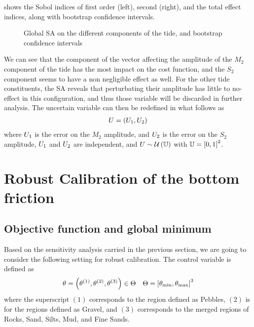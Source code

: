 \documentclass[../../Main_ManuscritThese.tex]{subfiles}
\newcommand{\zob}{z_b}
\newcommand\imgpath{/home/victor/acadwriting/Manuscrit/Text/Chapter5/img/}
\begin{document}
 shows the Sobol indices of first order (left), second
(right), and the total effect indices, along with bootstrap confidence
intervals.
\begin{figure}[ht]
  \centering
  
  \caption[SA on the tide components]{\label{fig:SA_tides} Global SA on the different components
    of the tide, and bootstrap confidence intervals}
\end{figure}

We can see that the component of the vector affecting the amplitude of
the $M_2$ component of the tide has the most impact on the cost
function, and the $S_2$ component seems to have a non negligible
effect as well. For the other tide constituents, the SA reveals that
perturbating their amplitude has little to no-effect in this
configuration, and thus those variable will be discarded in further
analysis. The uncertain variable can then be redefined in what follows as
\begin{align}
  \UU = (\UU_1, \UU_2)%
\end{align}
where $U_1$ is the error on the $M_2$ amplitude, and $U_2$ is the
error on the $S_2$ amplitude, $U_1$ and $U_2$ are independent, and
$U \sim \mathcal{U}\left(\mathbb{U}\right)$ with
$\Uspace = \interval{0}{1}^2$.

\section{Robust Calibration of the bottom friction}
\subsection{Objective function and global minimum}

Based on the sensitivity analysis carried in the previous section, we
are going to consider the following setting for robust calibration.
The control variable is defined as
\begin{equation}
  \kk=\left(\kk^{(1)},\kk^{(2)},\kk^{(3)}\right) \in \Kspace %
  \quad \Kspace = \interval{\kk_{\min}}{\kk_{\max}}^3
\end{equation}
 where the superscript $(1)$ corresponds to the region
defined as Pebbles, $(2)$ is for the regions defined as Gravel, and
$(3)$ corresponds to the merged regions of Rocks, Sand, Silts, Mud,
and Fine Sands.
\end{document}

